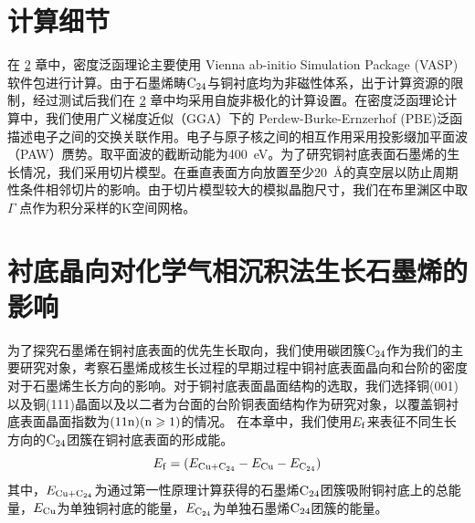 \section{计算细节}
    在 \ref{sec:石墨烯优先生长取向} 章中，密度泛函理论主要使用 Vienna ab-initio Simulation Package (VASP) 软件包进行计算。由于石墨烯畴$\rm{C_{24}}$与铜衬底均为非磁性体系，出于计算资源的限制，经过测试后我们在 \ref{sec:石墨烯优先生长取向} 章中均采用自旋非极化的计算设置。在密度泛函理论计算中，我们使用广义梯度近似（GGA）下的 Perdew-Burke-Ernzerhof (PBE)泛函描述电子之间的交换关联作用。电子与原子核之间的相互作用采用投影缀加平面波（PAW）赝势。取平面波的截断动能为\SI{400}{\electronvolt}。为了研究铜衬底表面石墨烯的生长情况，我们采用切片模型。在垂直表面方向放置至少\SI{20}{\angstrom}的真空层以防止周期性条件相邻切片的影响。由于切片模型较大的模拟晶胞尺寸，我们在布里渊区中取 $\Gamma$ 点作为积分采样的K空间网格。
\section{衬底晶向对化学气相沉积法生长石墨烯的影响}
\label{sec:石墨烯优先生长取向}
\def\CCluster#1{\rm{C_{#1}}}
    为了探究石墨烯在铜衬底表面的优先生长取向，我们使用碳团簇$\CCluster{24}$作为我们的主要研究对象，考察石墨烯成核生长过程的早期过程中铜衬底表面晶向和台阶的密度对于石墨烯生长方向的影响。对于铜衬底表面晶面结构的选取，我们选择铜(001)以及铜(111)晶面以及以二者为台面的台阶铜表面结构作为研究对象，以覆盖铜衬底表面晶面指数为$\rm{(11n)(n \geqslant 1)}$的情况。
    在本章中，我们使用$E_{\rm{f}}$来表征不同生长方向的$\CCluster{24}$团簇在铜衬底表面的形成能。
    \begin{equation}
        E_{\rm{f}}=
    (E_{\rm{Cu+\CCluster{24}}}-E_{\rm{Cu}}-E_{\rm{\CCluster{24}}})
    \end{equation}
    其中，$E_{\rm{Cu+\CCluster{24}}}$为通过第一性原理计算获得的石墨烯$\CCluster{24}$团簇吸附铜衬底上的总能量，$E_{\rm{Cu}}$为单独铜衬底的能量，$E_{\rm{\CCluster{24}}}$为单独石墨烯$\CCluster{24}$团簇的能量。
    
